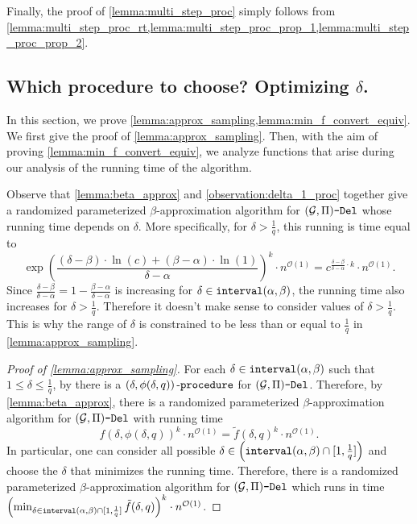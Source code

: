 \documentclass[letterpaper,11pt]{article}
\newcommand{\1}[1]{\mathds{1}\left[#1\right]}
\newcommand{\Oh}{\mathcal{O}}
\newcommand{\goodd}{\textnormal{\texttt{interval}}(\alpha, \beta)}
\newcommand{\proc}[2]{\left( #1, #2 \right)\textnormal{-\texttt{procedure}}}
\newcommand{\sgpivd}[1][\mathcal{G},\Pi]{(#1)\textnormal{\texttt{-Del}}}
\begin{document}
Finally, the proof of \cref{lemma:multi_step_proc} simply follows from
\cref{lemma:multi_step_proc_rt,lemma:multi_step_proc_prop_1,lemma:multi_step_proc_prop_2}.
 

\subsection{Which procedure to choose? Optimizing $\delta$.}
\label{sec:optim_delta}
In this section, we prove \cref{lemma:approx_sampling,lemma:min_f_convert_equiv}.
We first give the proof of \cref{lemma:approx_sampling}.
Then, with the aim of proving \cref{lemma:min_f_convert_equiv}, we 
analyze functions that arise during our analysis of the running time of the
algorithm. 

Observe that \cref{lemma:beta_approx} and \cref{observation:delta_1_proc} together
give a randomized parameterized $\beta$-approximation algorithm for $\sgpivd$
whose running time depends on $\delta$. More specifically, for $\delta > \frac{1}{q}$,
this running is time equal to
\begin{equation*}
	\exp\left( \frac{(\delta - \beta) \cdot \ln(c) + (\beta - \alpha) \cdot \ln\left( 1 \right) }{\delta - \alpha} \right)^{k} \cdot n^{\Oh(1)} = c^{\frac{\delta - \beta}{\delta - \alpha} \cdot k} \cdot n^{\Oh(1)}.
\end{equation*}
Since $\frac{\delta - \beta}{\delta - \alpha} = 1 - \frac{\beta - \alpha}{\delta - \alpha}$ is increasing for $\delta \in \goodd$,
the running time also increases for $\delta > \frac{1}{q}$.
Therefore it doesn't make sense to consider values of
$\delta > \frac{1}{q}$.
This is why the range of $\delta$ is constrained to be less than or equal to $\frac{1}{q}$ in \cref{lemma:approx_sampling}.
\begin{proof}[Proof of \cref{lemma:approx_sampling}]
	For each $\delta \in \goodd$ such that $1 \leq \delta \leq \frac{1}{q}$, by  there is a $\proc{\delta}{\phi(\delta,q)}$ for $\sgpivd$. Therefore,  
	by \cref{lemma:beta_approx}, there is a randomized parameterized
	$\beta$-approximation algorithm for $\sgpivd$ with running time
	\begin{equation*}
		f(\delta, \phi(\delta,q))^k\cdot n^{\Oh(1)}=\tilde{f}\left(\delta ,q \right)^{k} \cdot n^{\Oh(1)}.
	\end{equation*}
	In particular, one can consider all possible $\delta \in \Bigl(\goodd \cap [1,\frac{1}{q}]\Bigr)$
	and choose the $\delta$ that minimizes the running time.
	Therefore, there is a randomized  parameterized $\beta$-approximation algorithm for $\sgpivd$ which runs in time $\left(\min_{\delta\in  \goodd \cap [1,\frac{1}{q}]} \tilde{f}(\delta,q)\right)^k \cdot n^{\Oh(1)}$. 
\end{proof}
\end{document}
